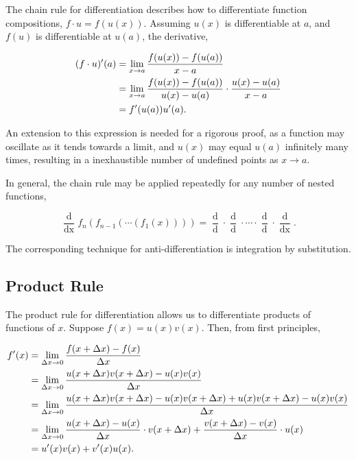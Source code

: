 \documentclass[11pt]{amsart}
\begin{document}
The chain rule for differentiation describes how to differentiate function compositions, $f \cdot u = f(u(x))$. Assuming $u(x)$ is differentiable at $a$, and $f(u)$ is differentiable at $u(a)$, the derivative,

\begin{align}
(f \cdot u)'(a) &= \lim_{x \to a}\frac{f(u(x)) - f(u(a))}{x - a} \notag \\
&= \lim_{x \to a}\frac{f(u(x)) - f(u(a))}{u(x) - u(a)} \cdot \frac{u(x) - u(a)}{x - a} \notag \\
&= f'(u(a))u'(a). \notag
\end{align}

An extension to this expression is needed for a rigorous proof, as a function may oscillate as it tends towards a limit, and $u(x)$ may equal $u(a)$ infinitely many times, resulting in a inexhaustible number of undefined points as $x \to a$.

In general, the chain rule may be applied repeatedly for any number of nested functions,

$$\frac{\mathop{d}}{\mathop{dx}} f_n(f_{n-1}(\cdots (f_1(x)))) = \frac{\mathop{df_n}}{\mathop{df_{n-1}}}\cdot \frac{\mathop{df_{n-1}}}{\mathop{df_{n-2}}} \cdot \cdots \cdot \frac{\mathop{df_2}}{\mathop{df_1}}\cdot \frac{\mathop{df_1}}{\mathop{dx}}.$$

The corresponding technique for anti-differentiation is integration by substitution.

\subsection{Product Rule}

The product rule for differentiation allows us to differentiate products of functions of $x$. Suppose $f(x) = u(x)v(x)$. Then, from first principles,

\begin{align}
f'(x) &= \lim_{\Delta x \to 0} \frac{f(x + \Delta x) - f(x)}{\Delta x} \notag \\
&= \lim_{\Delta x \to 0} \frac{u(x + \Delta x)v(x + \Delta x) - u(x)v(x)}{\Delta x} \notag \\
&= \lim_{\Delta x \to 0} \frac{u(x + \Delta x)v(x + \Delta x) - u(x)v(x + \Delta x) + u(x)v(x + \Delta x) - u(x)v(x)}{\Delta x} \notag \\
&= \lim_{\Delta x \to 0} \frac{u(x + \Delta x) - u(x)}{\Delta x}\cdot v(x + \Delta x) + \frac{v(x + \Delta x) - v(x)}{\Delta x}\cdot u(x)\notag \\
&= u'(x)v(x) + v'(x)u(x). \notag
\end{align}
\end{document}
